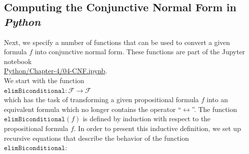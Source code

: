 \subsection{Computing the Conjunctive Normal Form in \textsl{Python}}
Next, we specify a number of functions that can be used to convert a given
formula $f$ into conjunctive normal form.  These functions are part of the Jupyter notebook
\\[0.2cm]
\hspace*{1.3cm}
\href{https://github.com/karlstroetmann/Logic/blob/master/Python/Chapter-4/04-CNF.ipynb}{Python/Chapter-4/04-CNF.ipynb}.
\\[0.2cm]
We start with the
function 
\\[0.2cm]
\hspace*{1.3cm}
$\texttt{elimBiconditional}: \mathcal{F} \rightarrow \mathcal{F}$
\\[0.2cm]
which has the task of transforming a given propositional formula $f$ into an equivalent formula
which no longer contains the operator ``$\leftrightarrow$''.  The function
$\texttt{elimBiconditional}(f)$ is defined by induction with respect to the propositional formula $f$.
In order to present this inductive definition, we set up recursive equations
that describe the behavior of the function $\texttt{elimBiconditional}$:
